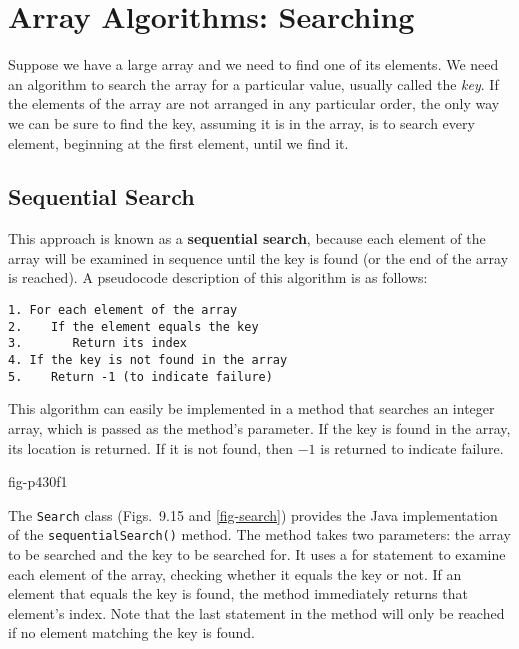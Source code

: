 \section{Array Algorithms: Searching}
\noindent Suppose we have a large array and we need to find one of its
elements.  We need an algorithm to search the array for a particular
value, usually called the {\it key}. If the elements of the array are
not arranged in any particular order, the only way we can be sure to
find the key, assuming it is in the array, is to search every element,
beginning at the first element, until we find it.


\subsection{Sequential Search}
\noindent This approach is known as a {\bf sequential
search}, because each element of the array will be examined in
sequence until the key is found (or the end of the array is
reached). A pseudocode description of this algorithm is as follows:

\begin{jjjlisting}
\begin{lstlisting}
1. For each element of the array
2.    If the element equals the key
3.       Return its index
4. If the key is not found in the array
5.    Return -1 (to indicate failure)
\end{lstlisting}
\end{jjjlisting}

This algorithm can easily be implemented in a method that searches an
integer array, which is passed as the method's parameter.  If the key
is found in the array, its location is returned.  If it is not found,
then $-1$ is returned to indicate failure.

{fig-p430f1}


The {\tt Search} class (Figs.~9.15 and \ref{fig-search})
provides the Java implementation of the {\tt sequentialSearch()} method.
The method takes two parameters: the array to be searched and the key
to be searched for.  It uses a for statement to examine each element
of the array, checking whether it equals the key or not.  If an
element that equals the key is found, the method immediately returns
that element's index.  Note that the last statement in the method will
only be reached if no element matching the key is found.

